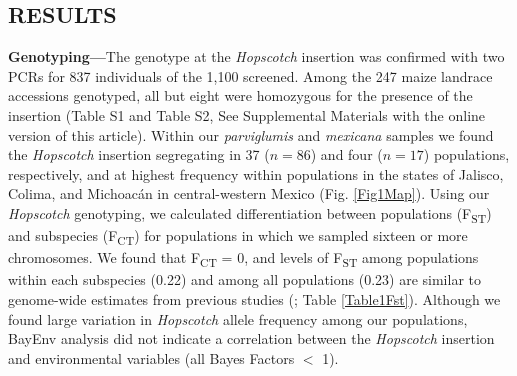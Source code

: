 \documentclass[11pt]{article} %
\begin{document}
\begin{linenumbers}
\begin{flushleft}
\begin{centering}
\section*{RESULTS}
\end{centering}

\textbf{Genotyping---}The genotype at the \emph{Hopscotch} insertion was confirmed with two PCRs for 837 individuals of the 1,100 screened. Among the 247 maize landrace accessions genotyped, all but eight were homozygous for the presence of the insertion (Table S1 and Table S2, See Supplemental Materials with the online version of this article). Within our \emph{parviglumis} and \emph{mexicana} samples we found the \emph{Hopscotch} insertion segregating in 37 ($n=86$) and four ($n=17$) populations, respectively, and at highest frequency within populations in the states of Jalisco, Colima, and Michoac\'{a}n in central-western Mexico (Fig. \ref{Fig1Map}). Using our \emph{Hopscotch} genotyping, we calculated differentiation between populations (F\textsubscript{ST}) and subspecies (F\textsubscript{CT}) for populations in which we sampled sixteen or more chromosomes. We found that F\textsubscript{CT} = 0, and levels of F\textsubscript{ST} among populations within each subspecies (0.22) and among all populations (0.23) are similar to genome-wide estimates from previous studies (\citealt{Pyhajarvi2013}; Table \ref{Table1Fst}). Although we found large variation in \emph{Hopscotch} allele frequency among our populations, BayEnv analysis did not indicate a correlation between the \emph{Hopscotch} insertion and environmental variables (all Bayes Factors $<$ 1). 


\end{flushleft}
\end{linenumbers}
\end{document}
